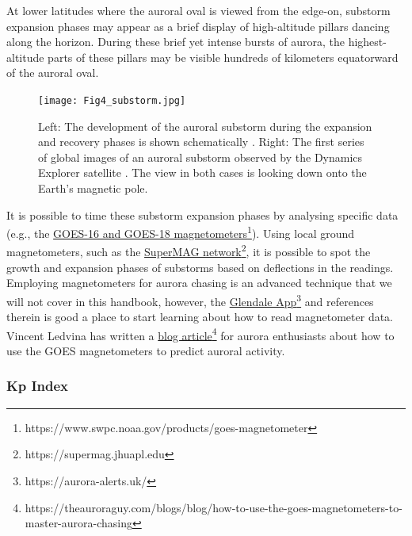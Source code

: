 \documentclass{article}
\renewcommand{\cite}[1]{\parencite{#1}}
\begin{document}
At lower latitudes where the auroral oval is viewed from the edge-on, substorm expansion phases may appear as a brief display of high-altitude pillars dancing along the horizon. During these brief yet intense bursts of aurora, the highest-altitude parts of these pillars may be visible hundreds of kilometers equatorward of the auroral oval.

\begin{figure}
  \texttt{[image: Fig4\_substorm.jpg]}
  \caption{Left: The development of the auroral substorm during the expansion and recovery phases is shown schematically \cite{Akasofu1964}. Right: The first series of global images of an auroral substorm observed by the Dynamics Explorer satellite \cite{frank1988}. The view in both cases is looking down onto the Earth's magnetic pole.} 
  \label{fig:substorm}
\end{figure}

It is possible to time these substorm expansion phases by analysing specific data (e.g., the \href{https://www.swpc.noaa.gov/products/goes-magnetometer}{GOES-16 and GOES-18 magnetometers}\footnote{https://www.swpc.noaa.gov/products/goes-magnetometer}). Using local ground magnetometers, such as the  \href{https://supermag.jhuapl.edu}{SuperMAG network}\footnote{https://supermag.jhuapl.edu}, it is possible to spot the growth and expansion phases of substorms based on deflections in the readings. Employing magnetometers for aurora chasing is an advanced technique that we will not cover in this handbook, however, the \href{https://aurora-alerts.uk/}{Glendale App}\footnote{https://aurora-alerts.uk/} and references therein is good a place to start learning about how to read magnetometer data. Vincent Ledvina has written a \href{https://theauroraguy.com/blogs/blog/how-to-use-the-goes-magnetometers-to-master-aurora-chasing}{blog article}\footnote{https://theauroraguy.com/blogs/blog/how-to-use-the-goes-magnetometers-to-master-aurora-chasing} for aurora enthusiasts about how to use the GOES magnetometers to predict auroral activity.

\subsubsection{Kp Index}\label{KPIndex}
\end{document}
